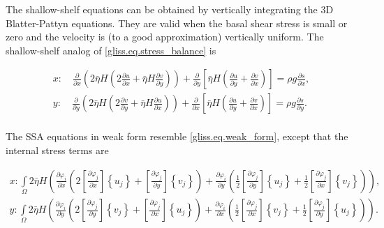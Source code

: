 The shallow-shelf equations can be obtained by vertically integrating the 3D Blatter-Pattyn equations.
They are valid when the basal shear stress is small or zero and the velocity is 
(to a good approximation) vertically uniform.  The shallow-shelf analog of \eqref{gliss.eq.stress_balance} is

\begin{equation}
  \label{gliss.eq.stress_balance_ssa}
  \begin{split}
    x: \quad \frac{\partial }{\partial x}\left( 2 \bar{\eta} H \left(2\frac{\partial u}{\partial x} +  \bar{\eta} H \frac{\partial v}{\partial y} \right) \right) 
    + \frac{\partial }{\partial y}\left[ \bar{\eta} H \left( \frac{\partial u}{\partial y} + \frac{\partial v}{\partial x} \right) \right] 
    = \rho g\frac{\partial s}{\partial x}, \\
    y: \quad \frac{\partial }{\partial y}\left( 2 \bar{\eta} H \left( 2\frac{\partial v}{\partial y} + \bar{\eta} H \frac{\partial u}{\partial x} \right) \right) 
    + \frac{\partial }{\partial x}\left[ \bar{\eta} H \left( \frac{\partial u}{\partial y} + \frac{\partial v}{\partial x} \right) \right] 
    = \rho g\frac{\partial s}{\partial y}.  \\
  \end{split}
\end{equation}

\noindent
The SSA equations in weak form resemble \eqref{gliss.eq.weak_form},
except that the internal stress terms are

\begin{equation}
  \label{gliss.eq.element_matrix_ssa}
  \begin{split}
    x: \int\limits_{\Omega }{2\bar{\eta} H \left( \frac{\partial {{\varphi }_{i}}}{\partial x}\left( 2\left[ \frac{\partial {{\varphi }_{j}}}{\partial x} \right]\left\{ {{u}_{j}} \right\} + \left[ \frac{\partial {{\varphi }_{j}}}{\partial y} \right]\left\{ {{v}_{j}} \right\} \right) +
      \frac{\partial {{\varphi }_{i}}}{\partial y}\left( \frac{1}{2}\left[ \frac{\partial {{\varphi }_{j}}}{\partial y} \right]\left\{ {{u}_{j}} \right\}+\frac{1}{2}\left[ \frac{\partial {{\varphi }_{j}}}{\partial x} \right]\left\{ {{v}_{j}} \right\} \right) \right)},  \\
    y: \int\limits_{\Omega }{2\bar{\eta} H \left( \frac{\partial {{\varphi }_{i}}}{\partial y}\left( 2\left[ \frac{\partial {{\varphi }_{j}}}{\partial y} \right]\left\{ {{v}_{j}} \right\} + \left[ \frac{\partial {{\varphi }_{j}}}{\partial x} \right]\left\{ {{u}_{j}} \right\} \right) + 
      \frac{\partial {{\varphi }_{i}}}{\partial x}\left( \frac{1}{2}\left[ \frac{\partial {{\varphi }_{j}}}{\partial x} \right]\left\{ {{v}_{j}} \right\}+\frac{1}{2}\left[ \frac{\partial {{\varphi }_{j}}}{\partial y} \right]\left\{ {{u}_{j}} \right\} \right) \right)}.  \\
  \end{split}
\end{equation}

